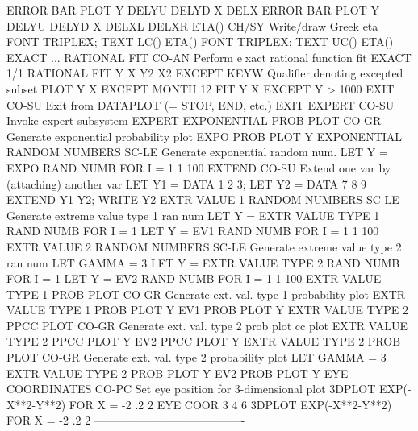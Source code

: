                                   ERROR BAR PLOT Y DELYU DELYD X DELX
                                  ERROR BAR PLOT Y DELYU DELYD X DELXL DELXR
ETA()                       CH/SY Write/draw Greek eta
                                  FONT TRIPLEX; TEXT LC() ETA()
                                  FONT TRIPLEX; TEXT UC() ETA()
EXACT ... RATIONAL FIT      CO-AN Perform exact rational function fit
                                  EXACT 1/1 RATIONAL FIT Y X Y2 X2
EXCEPT                      KEYW  Qualifier denoting excepted subset
                                  PLOT Y X EXCEPT MONTH 12
                                  FIT Y X EXCEPT Y > 1000
EXIT                        CO-SU Exit from DATAPLOT (= STOP, END, etc.)
                                  EXIT
EXPERT                      CO-SU Invoke expert subsystem
                                  EXPERT
EXPONENTIAL PROB PLOT       CO-GR Generate exponential probability plot
                                  EXPO PROB PLOT Y
EXPONENTIAL RANDOM NUMBERS  SC-LE Generate exponential random num.
                                  LET Y = EXPO RAND NUMB FOR I = 1 1 100
EXTEND                      CO-SU Extend one var by (attaching) another var
                                  LET Y1 = DATA 1 2 3; LET Y2 = DATA 7 8 9
                                  EXTEND Y1 Y2; WRITE Y2
EXTR VALUE 1 RANDOM NUMBERS SC-LE Generate extreme value type 1 ran num
                                  LET Y = EXTR VALUE TYPE 1 RAND NUMB FOR I = 1
                                  LET Y = EV1 RAND NUMB FOR I = 1 1 100
EXTR VALUE 2 RANDOM NUMBERS SC-LE Generate extreme value type 2 ran num
                                  LET GAMMA = 3
                                  LET Y = EXTR VALUE TYPE 2 RAND NUMB FOR I = 1
                                  LET Y = EV2 RAND NUMB FOR I = 1 1 100
EXTR VALUE TYPE 1 PROB PLOT CO-GR Generate ext. val. type 1 probability plot
                                  EXTR VALUE TYPE 1 PROB PLOT Y
                                  EV1 PROB PLOT Y
EXTR VALUE TYPE 2 PPCC PLOT CO-GR Generate ext. val. type 2 prob plot cc plot
                                  EXTR VALUE TYPE 2 PPCC PLOT Y
                                  EV2 PPCC PLOT Y
EXTR VALUE TYPE 2 PROB PLOT CO-GR Generate ext. val. type 2 probability plot
                                  LET GAMMA = 3
                                  EXTR VALUE TYPE 2 PROB PLOT Y
                                  EV2 PROB PLOT Y
EYE COORDINATES             CO-PC Set eye position for 3-dimensional plot
                               3DPLOT EXP(-X**2-Y**2) FOR X = -2 .2 2
                               EYE COOR 3 4 6
                               3DPLOT EXP(-X**2-Y**2) FOR X = -2 .2 2
----------------------------------------
 

